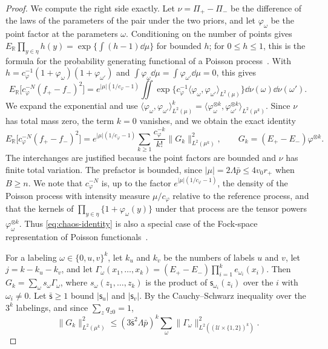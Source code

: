 \begin{proof}
We compute the right side exactly. Let $\nu=\Pi_+-\Pi_-$ be the
difference of the laws of the parameters of the pair under the two
priors, and let $\varphi_\omega$ be the point factor at the parameters
$\omega$. Conditioning on the number of points gives
$E_{\mathbb R}\prod_{y\in\eta}h(y)=\exp\{\int(h-1)\dd\mu\}$ for bounded
$h$; for $0\le h\le1$, this is the formula for the probability
generating functional of a Poisson
process~\cite[Section~3.3 and Exercise~3.6]{lastpenrose}. With
$h=c_\varphi^{-1}(1+\varphi_\omega)(1+\varphi_{\omega'})$ and
$\int\varphi_\omega\dd\mu=\int\varphi_{\omega'}\dd\mu=0$, this gives
\[
 E_{\mathbb R}\bigl[c_\varphi^{-N}(f_+-f_-)^2\bigr]
 =e^{|\mu|(1/c_\varphi-1)}\iint
 \exp\bigl\{c_\varphi^{-1}
 \langle\varphi_\omega,\varphi_{\omega'}\rangle_{L^2(\mu)}\bigr\}
 \dd\nu(\omega)\dd\nu(\omega').
\]
We expand the exponential and use
$\langle\varphi_\omega,\varphi_{\omega'}\rangle_{L^2(\mu)}^k
=\langle\varphi_\omega^{\otimes k},\varphi_{\omega'}^{\otimes k}
\rangle_{L^2(\mu^k)}$. Since $\nu$ has total mass zero, the term $k=0$
vanishes, and we obtain the exact identity
\begin{equation}\label{eq:chaos-identity}
 E_{\mathbb R}\bigl[c_\varphi^{-N}(f_+-f_-)^2\bigr]
 =e^{|\mu|(1/c_\varphi-1)}\sum_{k\ge1}\frac{c_\varphi^{-k}}{k!}
 \|G_k\|^2_{L^2(\mu^k)},\qquad
 G_k=(E_+-E_-)\varphi^{\otimes k}.
\end{equation}
The interchanges are justified because the point factors are bounded
and $\nu$ has finite total variation. The prefactor is bounded, since
$|\mu|=2\Lambda\bar p\le4v_0r_+$ when $B\ge n$. We note that
$c_\varphi^{-N}$ is, up to the factor $e^{|\mu|(1/c_\varphi-1)}$, the
density of the Poisson process with intensity measure $\mu/c_\varphi$
relative to the reference process, and that the kernels of
$\prod_{y\in\eta}\{1+\varphi_\omega(y)\}$ under that process are the
tensor powers $\varphi_\omega^{\otimes k}$. Thus
\eqref{eq:chaos-identity} is also a special case of the Fock-space
representation of Poisson functionals~\cite[Theorem~1.1]{lastpenrose2011}.

For a labeling $\omega\in\{0,u,v\}^k$, let $k_u$ and $k_v$ be the
numbers of labels $u$ and $v$, let $j=k-k_u-k_v$, and let
$\Gamma_\omega(x_1,\ldots,x_k)=(E_+-E_-)\prod_{i=1}^ke_{\omega_i}(x_i)$.
Then $G_k=\sum_\omega s_\omega\Gamma_\omega$, where
$s_\omega(z_1,\ldots,z_k)$ is the product of $\mathsf s_{\omega_i}(z_i)$
over the $i$ with $\omega_i\ne0$. Let $\bar{\mathsf s}\ge1$ bound
$|\mathsf s_u|$ and $|\mathsf s_v|$. By the Cauchy--Schwarz inequality
over the $3^k$ labelings, and since $\sum_zq_{z0}=1$,
\begin{equation}\label{eq:labelings}
 \|G_k\|^2_{L^2(\mu^k)}\le(3\bar{\mathsf s}^2\Lambda\bar p)^k
 \sum_\omega\|\Gamma_\omega\|^2_{L^2((\mathcal U\times\{1,2\})^k)}.
\end{equation}


\end{proof}
